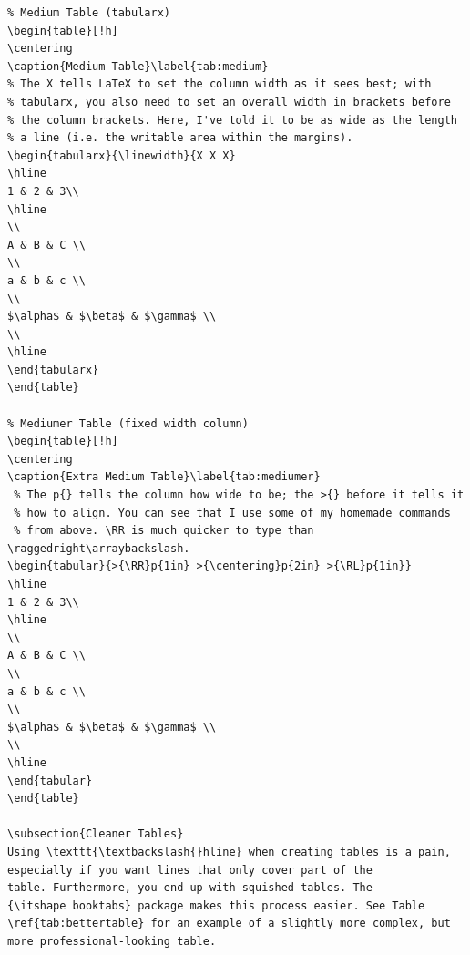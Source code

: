 \documentclass[12pt]{article}
\newcommand{\RR}{\raggedright\arraybackslash} %
\newcommand{\RL}{\raggedleft\arraybackslash} %
\begin{document}
\begin{verbatim}
% Medium Table (tabularx)
\begin{table}[!h]
\centering
\caption{Medium Table}\label{tab:medium}
% The X tells LaTeX to set the column width as it sees best; with
% tabularx, you also need to set an overall width in brackets before
% the column brackets. Here, I've told it to be as wide as the length
% a line (i.e. the writable area within the margins).
\begin{tabularx}{\linewidth}{X X X}
\hline
1 & 2 & 3\\
\hline
\\
A & B & C \\
\\
a & b & c \\
\\
$\alpha$ & $\beta$ & $\gamma$ \\
\\
\hline
\end{tabularx}
\end{table}

% Mediumer Table (fixed width column)
\begin{table}[!h]
\centering
\caption{Extra Medium Table}\label{tab:mediumer}
 % The p{} tells the column how wide to be; the >{} before it tells it
 % how to align. You can see that I use some of my homemade commands
 % from above. \RR is much quicker to type than \raggedright\arraybackslash.
\begin{tabular}{>{\RR}p{1in} >{\centering}p{2in} >{\RL}p{1in}}
\hline
1 & 2 & 3\\
\hline
\\
A & B & C \\
\\
a & b & c \\
\\
$\alpha$ & $\beta$ & $\gamma$ \\
\\
\hline
\end{tabular}
\end{table}

\subsection{Cleaner Tables}
Using \texttt{\textbackslash{}hline} when creating tables is a pain,
especially if you want lines that only cover part of the
table. Furthermore, you end up with squished tables. The
{\itshape booktabs} package makes this process easier. See Table
\ref{tab:bettertable} for an example of a slightly more complex, but
more professional-looking table.


\end{verbatim}
\end{document}

